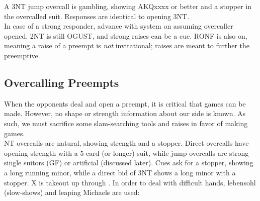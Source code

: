 \documentclass[12pt]{report}
\newcommand{\n}{\\}
\begin{document}
    A 3NT jump overcall is gambling, showing AKQxxxx or better and a stopper in the overcalled suit.  Responses are identical to opening 3NT. \n

    In case of a strong responder, advance with system on assuming overcaller opened.  2NT is still OGUST, and strong raises can be a cue. RONF is also on, meaning a raise of a preempt is \textit{not} invitational; raises are meant to further the preemptive.

\subsection{Overcalling Preempts}

    When the opponents deal and open a preempt, it is critical that games can be made.  However, no shape or strength information about our side is known.  As such, we must sacrifice some slam-searching tools and raises in favor of making games. \n

    NT overcalls are natural, showing strength and a stopper.  Direct overcalls have opening strength with a 5-card (or longer) suit, while jump overcalls are strong single suitors (GF) or artificial (discussed later).  Cues ask for a stopper, showing a long running minor, while a direct bid of 3NT shows a long minor with a stopper. X is takeout up through .  In order to deal with difficult hands, lebensohl (slow-shows) and leaping Michaels are used:
\end{document}
